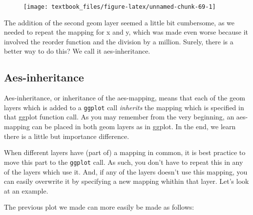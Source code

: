 \documentclass[]{tufte-book}
\begin{document}
\begin{figure}
\texttt{[image: textbook\_files/figure-latex/unnamed-chunk-69-1]} \end{figure}

The addition of the second geom layer seemed a little bit cumbersome, as we needed to repeat the mapping for x and y, which was made even worse because it involved the reorder function and the division by a million. Surely, there is a better way to do this? We call it aes-inheritance.

\hypertarget{aes-inheritance}{%
\subsection{Aes-inheritance}\label{aes-inheritance}}

Aes-inheritance, or inheritance of the aes-mapping, means that each of the geom layers which is added to a \texttt{ggplot} call \emph{inherits} the mapping which is specified in that ggplot function call. As you may remember from the very beginning, an aes-mapping can be placed in both geom layers as in ggplot. In the end, we learn there is a little but importance difference.

When different layers have (part of) a mapping in common, it is best practice to move this part to the \texttt{ggplot} call. As such, you don't have to repeat this in any of the layers which use it. And, if any of the layers doesn't use this mapping, you can easily overwrite it by specifying a new mapping whithin that layer. Let's look at an example.

The previous plot we made can more easily be made as follows:
\end{document}
